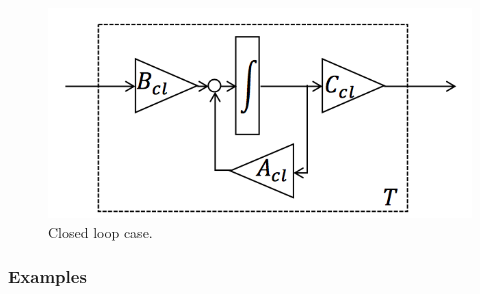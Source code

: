 \documentclass[a4paper,12 pt]{article}
\numberwithin{equation}{section}
\theoremstyle{definition}
\theoremstyle{remark}
\theoremstyle{definition}
\theoremstyle{definition}
\theoremstyle{definition}
\theoremstyle{remark}
\begin{document}
\begin{figure}[h]
\begin{center}
\includegraphics[width=0.4\columnwidth]{contrcl.png}
\caption{Closed loop case.}
\label{fig:contrcl}
\end{center}
\end{figure} 
\pagebreak



\subsubsection{Examples}
\end{document}
